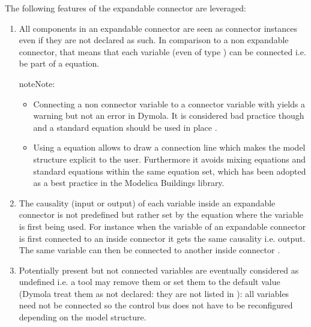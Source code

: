 \documentclass[letterpaper,10pt, openany,english]{sphinxmanual}
\begin{document}
The following features of the expandable connector are leveraged:
\begin{enumerate}
%
\item {} 
All components in an expandable connector are seen as connector instances even if they are not declared as such. In comparison to a non expandable connector, that means that each variable (even of type ) can be connected i.e. be part of a  equation.

\begin{sphinxadmonition}{note}{Note:}\begin{itemize}
\item {} 
Connecting a non connector variable to a connector variable with  yields a warning but not an error in Dymola. It is considered bad practice though and a standard equation should be used in place .

\item {} 
Using a  equation allows to draw a connection line which makes the model structure explicit to the user. Furthermore it avoids mixing  equations and standard equations within the same equation set, which has been adopted as a best practice in the Modelica Buildings library.

\end{itemize}
\end{sphinxadmonition}

\item {} 
The causality (input or output) of each variable inside an expandable connector is not predefined but rather set by the  equation where the variable is first being used. For instance when the variable of an expandable connector is first connected to an inside connector  it gets the same causality i.e. output. The same variable can then be connected to another inside connector  .

\item {} 
Potentially present but not connected variables are eventually considered as undefined i.e. a tool may remove them or set them to the default value (Dymola treat them as not declared: they are not listed in ): all variables need not be connected so the control bus does not have to be reconfigured depending on the model structure.


\end{enumerate}
\end{document}
